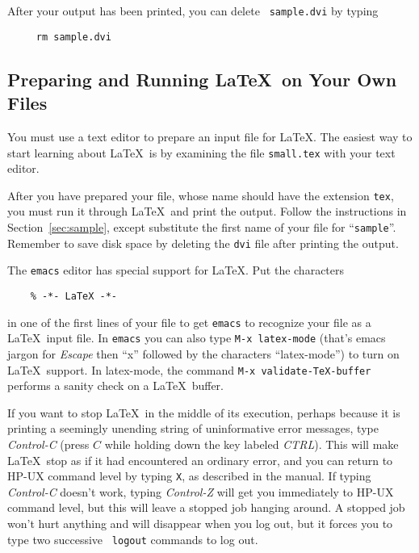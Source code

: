 After your output has been printed, you can delete \mbox{\tt
sample.dvi} by typing
\begin{verbatim}
     rm sample.dvi 
\end{verbatim}

\subsection{Preparing and Running \LaTeX\ on Your Own Files}

You must use a text editor to prepare an input file for \LaTeX.
The easiest way to start learning about \LaTeX\ is by 
examining the file \mbox{\tt small.tex} with your text editor.

After you have prepared your file, whose name should have the extension
{\tt tex}, you must run it through \LaTeX\ and print the output.
Follow the instructions in Section~\ref{sec:sample}, except substitute
the first name of your file for ``\mbox{\tt sample}''.  Remember to
save disk space by deleting the {\tt dvi} file after printing the
output.



The {\tt emacs} editor has special support for \LaTeX.
Put the characters
\begin{verbatim}
    % -*- LaTeX -*-
\end{verbatim}
in one of the first lines of your file to get {\tt emacs} to recognize your
file as a \LaTeX\ input file.
In {\tt emacs} you can also type {\tt M-x latex-mode}
(that's emacs jargon for {\em Escape\/} then ``x'' followed by the characters
``latex-mode'')
to turn on \LaTeX\ support.
In latex-mode,
the command {\tt M-x validate-TeX-buffer} performs a sanity check
on a \LaTeX\ buffer.

If you want to stop \LaTeX\ in the middle of its execution, perhaps
because it is printing a seemingly unending string of uninformative
error messages, type {\em Control-C\/} (press $C$ while holding down
the key labeled {\em CTRL\/}).  This will make \LaTeX\ stop as if it
had encountered an ordinary error, and you can return to HP-UX command
level by typing {\tt X}, as described in the manual.  If typing {\em
Control-C\/} doesn't work, typing {\em Control-Z\/} will get you
immediately to HP-UX command level, but this will leave a stopped job
hanging around.  A stopped job won't hurt anything and will disappear
when you log out, but it forces you to type two successive \mbox{\tt
logout} commands to log out.

